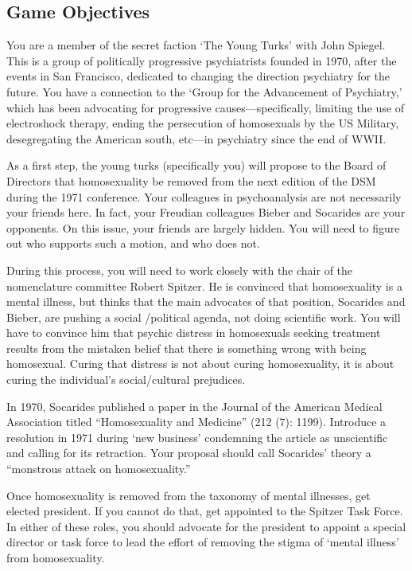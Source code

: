 \begin{refsection}
\section{Game Objectives}
\label{gameobjectives}

You are a member of the secret faction `The Young Turks' with John Spiegel. This is a group of politically progressive psychiatrists founded in 1970, after the events in San Francisco, dedicated to changing the direction psychiatry for the future. You have a connection to the `Group for the Advancement of Psychiatry,' which has been advocating for progressive causes---specifically, limiting the use of electroshock therapy, ending the persecution of homosexuals by the US Military, desegregating the American south, etc---in psychiatry since the end of WWII. 

As a first step, the young turks (specifically you) will propose to the Board of Directors that homosexuality be removed from the next edition of the DSM during the 1971 conference. Your colleagues in psychoanalysis are not necessarily your friends here. In fact, your Freudian colleagues Bieber and Socarides are your opponents. On this issue, your friends are largely hidden. You will need to figure out who supports such a motion, and who does not.

During this process, you will need to work closely with the chair of the nomenclature committee Robert Spitzer. He is convinced that homosexuality is a mental illness, but thinks that the main advocates of that position, Socarides and Bieber, are pushing a social \slash  political agenda, not doing scientific work. You will have to convince him that psychic distress in homosexuals seeking treatment results from the mistaken belief that there is something wrong with being homosexual. Curing that distress is not about curing homosexuality, it is about curing the individual's social\slash cultural prejudices.

In 1970, Socarides published a paper in the Journal of the American Medical Association titled ``Homosexuality and Medicine'' (212 (7): 1199). Introduce a resolution in 1971 during `new business' condemning the article as unscientific and calling for its retraction. Your proposal should call Socarides' theory a ``monstrous attack on homosexuality.''

Once homosexuality is removed from the taxonomy of mental illnesses, get elected president. If you cannot do that, get appointed to the Spitzer Task Force. In either of these roles, you should advocate for the president to appoint a special director or task force to lead the effort of removing the stigma of `mental illness' from homosexuality.


\end{refsection}
